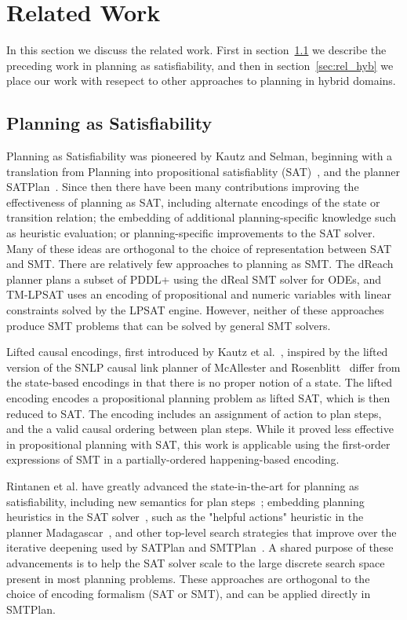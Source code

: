 \section{Related Work}\label{sec:related_work}

In this section we discuss the related work. First in section~\ref{sec:rel_sat} we describe the preceding work in planning as satisfiability, and then in section~\ref{sec:rel_hyb} we place our work with resepect to other approaches to planning in hybrid domains.

\subsection{Planning as Satisfiability}\label{sec:rel_sat}

Planning as Satisfiability was pioneered by Kautz and Selman, beginning with a translation from Planning into propositional satisfiablity (SAT)~\cite{kau92}, and the planner SATPlan~\cite{kau06}. Since then there have been many contributions improving the effectiveness of planning as SAT, including alternate encodings of the state or transition relation; the embedding of additional planning-specific knowledge such as heuristic evaluation; or planning-specific improvements to the SAT solver. Many of these ideas are orthogonal to the choice of representation between SAT and SMT.
%
There are relatively few approaches to planning as SMT. The dReach planner plans a subset of PDDL+ using the dReal SMT solver for ODEs, and {\sc TM-LPSAT} uses an encoding of propositional and numeric variables with linear constraints solved by the LPSAT engine. However, neither of these approaches produce SMT problems that can be solved by general SMT solvers.

Lifted causal encodings, first introduced by Kautz et al.~\cite{kau96a}, inspired by the lifted version of the SNLP causal link planner of McAllester and Rosenblitt~\cite{mca91} differ from the state-based encodings in that there is no proper notion of a state. The lifted encoding encodes a propositional planning problem as lifted SAT, which is then reduced to SAT. The encoding includes an assignment of action to plan steps, and the a valid causal ordering between plan steps. While it proved less effective in propositional planning with SAT, this work is applicable using the first-order expressions of SMT in a partially-ordered happening-based encoding.

Rintanen et al. have greatly advanced the state-in-the-art for planning as satisfiability, including new semantics for plan steps~\cite{rin06}; embedding planning heuristics in the SAT solver~\cite{rin10a}, such as the "helpful actions" heuristic in the planner Madagascar~\cite{rin10}, and other top-level search strategies that improve over the iterative deepening used by SATPlan and SMTPlan~\cite{rin04}. A shared purpose of these advancements is to help the SAT solver scale to the large discrete search space present in most planning problems. These approaches are orthogonal to the choice of encoding formalism (SAT or SMT), and can be applied directly in SMTPlan.


